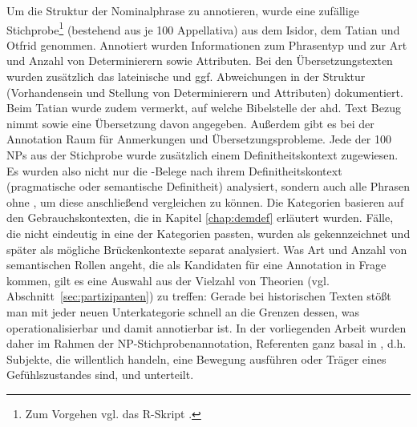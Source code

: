 Um die Struktur der Nominalphrase zu  annotieren, wurde eine zufällige Stichprobe\footnote{Zum Vorgehen vgl. das R-Skript  \parencite{HZKYL4_2020}.} (bestehend aus je 100  Appellativa) aus dem Isidor, dem Tatian und Otfrid genommen. Annotiert wurden Informationen zum Phrasentyp  und zur Art und Anzahl von Determinierern  sowie Attributen. Bei den Übersetzungstexten wurden zusätzlich das lateinische  und ggf. Abweichungen in der Struktur  (Vorhandensein und  Stellung von Determinierern  und Attributen) dokumentiert. Beim Tatian wurde zudem vermerkt, auf welche Bibelstelle der ahd. Text Bezug nimmt sowie eine Übersetzung davon angegeben. Außerdem gibt es bei der Annotation Raum für Anmerkungen und Übersetzungsprobleme.
Jede der 100 NPs  aus der  Stichprobe wurde zusätzlich einem Definitheitskontext  zugewiesen. Es wurden also nicht nur die -Belege nach ihrem Definitheitskontext  (pragmatische   oder semantische  Definitheit) analysiert, sondern auch alle Phrasen  ohne , um diese anschließend vergleichen zu können. 
Die Kategorien basieren auf den Gebrauchskontexten, die in Kapitel \ref{chap:demdef} erläutert wurden. Fälle, die nicht eindeutig in eine der Kategorien passten, wurden als  gekennzeichnet und später als mögliche Brückenkontexte  separat analysiert. 
Was Art und Anzahl von semantischen Rollen  angeht, die als Kandidaten für eine Annotation in Frage kommen, gilt es eine Auswahl aus der Vielzahl von Theorien (vgl. Abschnitt~\ref{sec:partizipanten}) zu treffen: Gerade bei historischen Texten stößt man mit jeder neuen Unterkategorie schnell an die Grenzen dessen, was operationalisierbar  und damit annotierbar  ist. In der vorliegenden Arbeit wurden daher im Rahmen der NP-Stichprobenannotation, Referenten ganz basal  in , d.h.  Subjekte, die willentlich handeln,  eine Bewegung ausführen oder Träger eines Gefühlszustandes sind,  und  unterteilt.


